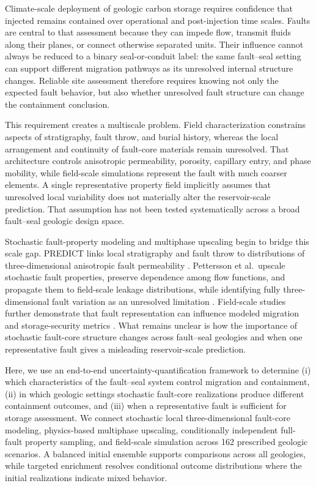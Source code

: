 
Climate-scale deployment of geologic carbon storage requires confidence that
injected \coTwo{} remains contained over operational and post-injection time
scales. Faults are central to that assessment because they can impede flow,
transmit fluids along their planes, or connect otherwise separated units.
Their influence cannot always be reduced to a binary seal-or-conduit label:
the same fault--seal setting can support different migration pathways as its
unresolved internal structure changes. Reliable site assessment therefore
requires knowing not only the expected fault behavior, but also whether
unresolved fault structure can change the containment conclusion.

This requirement creates a multiscale problem. Field characterization
constrains aspects of stratigraphy, fault throw, and burial history, whereas
the local arrangement and continuity of fault-core materials remain
unresolved. That architecture controls anisotropic permeability, porosity,
capillary entry, and phase mobility, while field-scale simulations represent
the fault with much coarser elements. A single representative property field
implicitly assumes that unresolved local variability does not materially
alter the reservoir-scale prediction. That assumption has not been tested
systematically across a broad fault--seal geologic design space.

Stochastic fault-property modeling and multiphase upscaling begin to bridge
this scale gap. PREDICT links local stratigraphy and fault throw to
distributions of three-dimensional anisotropic fault permeability
\cite{SaloSalgado2023}. Pettersson et al.\ upscale stochastic fault properties,
preserve dependence among flow functions, and propagate them to field-scale
leakage distributions, while identifying fully three-dimensional fault
variation as an unresolved limitation \cite{Pettersson2025}. Field-scale
studies further demonstrate that fault representation can influence modeled
\coTwo{} migration and storage-security metrics
\cite{SaloSalgado2025,Lu2025}. What remains unclear is how the importance of
stochastic fault-core structure changes across fault--seal geologies and when
one representative fault gives a misleading reservoir-scale prediction.

Here, we use an end-to-end uncertainty-quantification framework to determine
(i) which characteristics of the fault--seal system control \coTwo{} migration
and containment, (ii) in which geologic settings stochastic fault-core
realizations produce different containment outcomes, and (iii) when a
representative fault is sufficient for storage assessment. We connect
stochastic local three-dimensional fault-core modeling, physics-based
multiphase upscaling, conditionally independent full-fault property sampling,
and field-scale simulation across 162 prescribed geologic scenarios. A
balanced initial ensemble supports comparisons across all geologies, while
targeted enrichment resolves conditional outcome distributions where the
initial realizations indicate mixed behavior.
